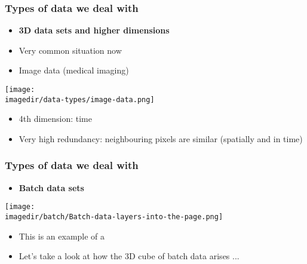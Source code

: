 
\begin{frame}\frametitle{Types of data we deal with}
	\begin{itemize}
		\item	\textbf{3D data sets and higher dimensions}
	\end{itemize}
	\begin{itemize}
		\item	Very common situation now
		\item	Image data (medical imaging)
	\end{itemize}

	\texttt{[image: \\imagedir/data-types/image-data.png]}
	\begin{itemize}
		\item	4th dimension: time
		\item	Very high redundancy: neighbouring pixels are similar (spatially and in time)
	\end{itemize}
\end{frame}

\begin{frame}\frametitle{Types of data we deal with}
	\begin{itemize}
		\item	\textbf{Batch data sets}
	\end{itemize}

	\texttt{[image: \\imagedir/batch/Batch-data-layers-into-the-page.png]}
	
	\begin{itemize}
		\item	This is an example of a {\color{purple}{multiblock data set}}
		\item	Let's take a look at how the 3D cube of batch data arises ...
	\end{itemize}
\end{frame}

